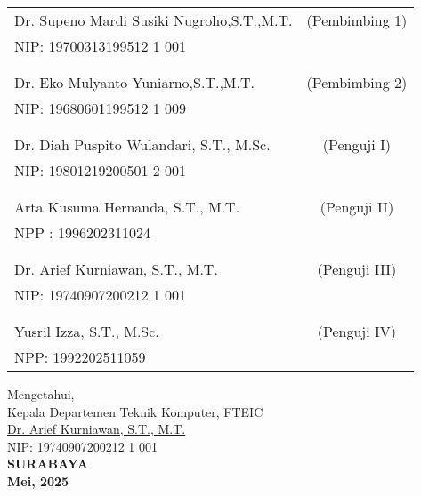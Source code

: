 \noindent
    \begin{tabularx}{\textwidth}{X c}
      Dr. Supeno Mardi Susiki Nugroho,S.T.,M.T.          & (Pembimbing 1) \\
      NIP: 19700313199512 1 001       & \\
      &  \\
      &  \\
      Dr. Eko Mulyanto Yuniarno,S.T.,M.T.     & (Pembimbing 2) \\
      NIP: 19680601199512 1 009       & \\
      &  \\
      &  \\
      Dr. Diah Puspito Wulandari, S.T., M.Sc.  & (Penguji I) \\
      NIP: 19801219200501 2 001         & \\
      &  \\
      &  \\
      Arta Kusuma Hernanda, S.T., M.T.  & (Penguji II) \\
      NPP : 1996202311024       & \\
      &  \\
      &  \\
      Dr. Arief Kurniawan, S.T., M.T.           & (Penguji III) \\
      NIP: 19740907200212 1 001       & \\
      &  \\
      &  \\
      Yusril Izza, S.T., M.Sc.           & (Penguji IV) \\
      NPP: 1992202511059       & \\
    \end{tabularx}
\endgroup
\begin{center}
    Mengetahui,\\
  Kepala Departemen Teknik Komputer, FTEIC\\
  \vspace{10ex}
  \underline{Dr. Arief Kurniawan, S.T., M.T. }\\
  NIP: 19740907200212 1 001 \\
  \vspace{6ex}
  \textbf{SURABAYA} \\
  \textbf{Mei, 2025}
\end{center}
\endgroup